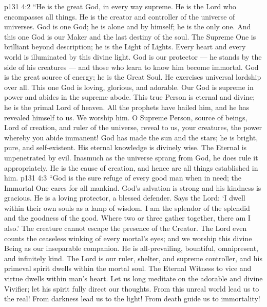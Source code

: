 \vs p131 4:2 \pc “He is the great God, in every way supreme. He is the Lord who encompasses all things. He is the creator and controller of the universe of universes. God is one God; he is alone and by himself; he is the only one. And this one God is our Maker and the last destiny of the soul. The Supreme One is brilliant beyond description; he is the Light of Lights. Every heart and every world is illuminated by this divine light. God is our protector --- he stands by the side of his creatures --- and those who learn to know him become immortal. God is the great source of energy; he is the Great Soul. He exercises universal lordship over all. This one God is loving, glorious, and adorable. Our God is supreme in power and abides in the supreme abode. This true Person is eternal and divine; he is the primal Lord of heaven. All the prophets have hailed him, and he has revealed himself to us. We worship him. O Supreme Person, source of beings, Lord of creation, and ruler of the universe, reveal to us, your creatures, the power whereby you abide immanent! God has made the sun and the stars; he is bright, pure, and self\hyp{}existent. His eternal knowledge is divinely wise. The Eternal is unpenetrated by evil. Inasmuch as the universe sprang from God, he does rule it appropriately. He is the cause of creation, and hence are all things established in him.
\vs p131 4:3 “God is the sure refuge of every good man when in need; the Immortal One cares for all mankind. God’s salvation is strong and his kindness is gracious. He is a loving protector, a blessed defender. Says the Lord: ‘I dwell within their own souls as a lamp of wisdom. I am the splendor of the splendid and the goodness of the good. Where two or three gather together, there am I also.’ The creature cannot escape the presence of the Creator. The Lord even counts the ceaseless winking of every mortal’s eyes; and we worship this divine Being as our inseparable companion. He is all\hyp{}prevailing, bountiful, omnipresent, and infinitely kind. The Lord is our ruler, shelter, and supreme controller, and his primeval spirit dwells within the mortal soul. The Eternal Witness to vice and virtue dwells within man’s heart. Let us long meditate on the adorable and divine Vivifier; let his spirit fully direct our thoughts. From this unreal world lead us to the real! From darkness lead us to the light! From death guide us to immortality!

